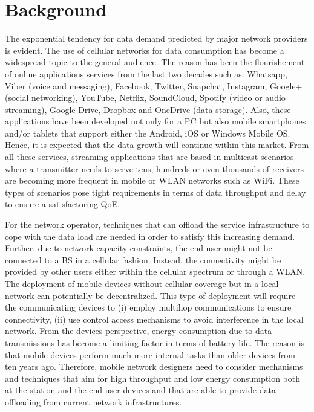 \section{Background}\label{sec:background}

The exponential tendency for data demand predicted by major network providers \cite{cisco2016forecast,kremling2015presentation} is evident. The use of cellular networks for data consumption has become a widespread topic to the general audience. The reason has been the flourishement of online applications services from the last two decades such as:  Whatsapp, Viber (voice and messaging), Facebook, Twitter, Snapchat, Instagram, Google+ (social networking), YouTube, Netflix, SoundCloud, Spotify (video or audio streaming), Google Drive, Dropbox and OneDrive (data storage). Also, these applications have been developed not only for a \ac{PC} but also mobile smartphones and/or tablets that support either the Android, iOS or Windows Mobile \ac{OS}. Hence, it is expected that the data growth will continue within this market. From all these services, streaming applications that are based in multicast scenarios where a transmitter needs to serve tens, hundreds or even thousands of receivers are becoming more frequent in mobile or \ac{WLAN} networks such as \ac{WiFi}. These types of scenarios pose tight requirements in terms of data throughput and delay to ensure a satisfactoring \ac{QoE}.

For the network operator, techniques that can offload the service infrastructure to cope with the data load are needed in order to satisfy this increasing demand. Further, due to network capacity constraints, the end-user might not be connected to a \ac{BS} in a cellular fashion. Instead, the connectivity might be provided by other users either within the cellular spectrum or through a \ac{WLAN}. The deployment of mobile devices without cellular coverage but in a local network can potentially be decentralized. This type of deployment will require the communicating devices to (i) employ multihop communications to ensure connectivity, (ii) use control access mechanisms to avoid interference in the local network. From the devices perspective, energy consumption due to data transmissions has become a limiting factor in terms of battery life. The reason is that mobile devices perform much more internal tasks than older devices from ten years ago. Therefore, mobile network designers need to consider mechanisms and techniques that aim for high throughput and low energy consumption both at the station and the end user devices and that are able to provide data offloading from current network infrastructures.


